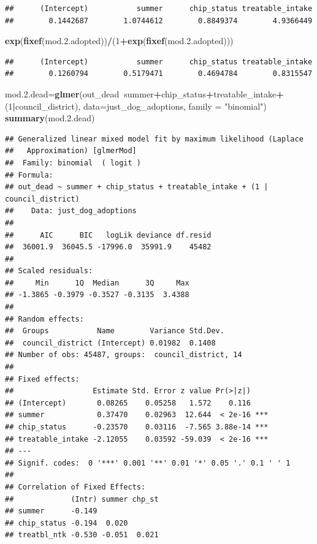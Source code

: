 \documentclass[]{article}
\newenvironment{Shaded}{\begin{snugshade}}{\end{snugshade}}
\newcommand{\KeywordTok}[1]{\textcolor[rgb]{0.13,0.29,0.53}{\textbf{#1}}}
\newcommand{\DataTypeTok}[1]{\textcolor[rgb]{0.13,0.29,0.53}{#1}}
\newcommand{\DecValTok}[1]{\textcolor[rgb]{0.00,0.00,0.81}{#1}}
\newcommand{\FloatTok}[1]{\textcolor[rgb]{0.00,0.00,0.81}{#1}}
\newcommand{\StringTok}[1]{\textcolor[rgb]{0.31,0.60,0.02}{#1}}
\newcommand{\OperatorTok}[1]{\textcolor[rgb]{0.81,0.36,0.00}{\textbf{#1}}}
\newcommand{\NormalTok}[1]{#1}
\begin{document}
\begin{verbatim}
##      (Intercept)           summer      chip_status treatable_intake 
##        0.1442687        1.0744612        0.8849374        4.9366449
\end{verbatim}

\begin{Shaded}
\begin{Highlighting}[]
\KeywordTok{exp}\NormalTok{(}\KeywordTok{fixef}\NormalTok{(mod.}\FloatTok{2.}\NormalTok{adopted))}\OperatorTok{/}\NormalTok{(}\DecValTok{1}\OperatorTok{+}\KeywordTok{exp}\NormalTok{(}\KeywordTok{fixef}\NormalTok{(mod.}\FloatTok{2.}\NormalTok{adopted)))}
\end{Highlighting}
\end{Shaded}

\begin{verbatim}
##      (Intercept)           summer      chip_status treatable_intake 
##        0.1260794        0.5179471        0.4694784        0.8315547
\end{verbatim}

\begin{Shaded}
\begin{Highlighting}[]
\NormalTok{mod.}\FloatTok{2.}\NormalTok{dead=}\KeywordTok{glmer}\NormalTok{(out_dead}\OperatorTok{~}\NormalTok{summer}\OperatorTok{+}\NormalTok{chip_status}\OperatorTok{+}\NormalTok{treatable_intake}\OperatorTok{+}\NormalTok{(}\DecValTok{1}\OperatorTok{|}\NormalTok{council_district), }\DataTypeTok{data=}\NormalTok{just_dog_adoptions, }\DataTypeTok{family =} \StringTok{"binomial"}\NormalTok{)}
\KeywordTok{summary}\NormalTok{(mod.}\FloatTok{2.}\NormalTok{dead)}
\end{Highlighting}
\end{Shaded}

\begin{verbatim}
## Generalized linear mixed model fit by maximum likelihood (Laplace
##   Approximation) [glmerMod]
##  Family: binomial  ( logit )
## Formula: 
## out_dead ~ summer + chip_status + treatable_intake + (1 | council_district)
##    Data: just_dog_adoptions
## 
##      AIC      BIC   logLik deviance df.resid 
##  36001.9  36045.5 -17996.0  35991.9    45482 
## 
## Scaled residuals: 
##     Min      1Q  Median      3Q     Max 
## -1.3865 -0.3979 -0.3527 -0.3135  3.4388 
## 
## Random effects:
##  Groups           Name        Variance Std.Dev.
##  council_district (Intercept) 0.01982  0.1408  
## Number of obs: 45487, groups:  council_district, 14
## 
## Fixed effects:
##                  Estimate Std. Error z value Pr(>|z|)    
## (Intercept)       0.08265    0.05258   1.572    0.116    
## summer            0.37470    0.02963  12.644  < 2e-16 ***
## chip_status      -0.23570    0.03116  -7.565 3.88e-14 ***
## treatable_intake -2.12055    0.03592 -59.039  < 2e-16 ***
## ---
## Signif. codes:  0 '***' 0.001 '**' 0.01 '*' 0.05 '.' 0.1 ' ' 1
## 
## Correlation of Fixed Effects:
##             (Intr) summer chp_st
## summer      -0.149              
## chip_status -0.194  0.020       
## treatbl_ntk -0.530 -0.051  0.021
\end{verbatim}
\end{document}
